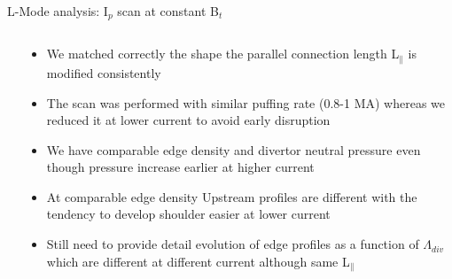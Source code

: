 \documentclass[10pt, compress]{beamer}
\newcommand\Fontvi{\fontsize{8}{7.2}\selectfont}
\begin{document}
\begin{frame}{L-Mode analysis: I$_p$ scan at constant B$_t$}
\Fontvi
  \vspace{-1cm}
\begin{columns}
  \begin{column}{0.65\textwidth}

  \end{column}
  \begin{column}{0.35\textwidth}
    \begin{itemize}
      \item<1|only@1> We matched correctly the shape the parallel
        connection length L$_{\parallel}$ is modified consistently
      \item<2|only@2> The scan was performed with similar puffing rate (0.8-1
        MA) whereas we reduced it at lower current to avoid early disruption
      \item<2|only@2> We have comparable edge density and divertor neutral
        pressure even though pressure increase earlier at higher current
      \item<3-> At comparable edge density Upstream profiles are
        different with the tendency to develop shoulder easier at
        lower current
      \item<4-> Still need to provide detail evolution of edge
        profiles as a function
        of $\Lambda_{div}$ which are different at different current
        although same L$_{\parallel}$
      \end{itemize}
    \end{column}
\end{columns}
\end{frame}


  
\end{document}
